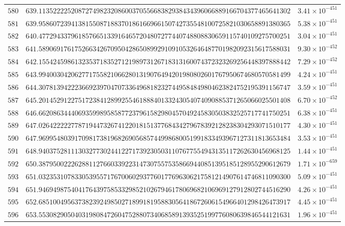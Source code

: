 \documentclass[12pt,reqno]{amsart}
\theoremstyle{remark}
\begin{document}
\begin{longtable}{clc}
$580$ & $639.1135222252087274982320860037055668382938434396066889166704377465641302$ & $3.41\times 10^{-451}$ \\
$581$ & $639.9586072394138155087188370186166966150742735548100725821030658891380365$ & $5.38\times 10^{-451}$ \\
$582$ & $640.4772943379618576651339164657204807277440748808830659115740109275700251$ & $3.04\times 10^{-451}$ \\
$583$ & $641.5890691761752663426709504286508992910910532646487701982092315617588031$ & $9.30\times 10^{-452}$ \\
$584$ & $642.1554245986132353718352712198973126718313160074372323269256448397888442$ & $7.29\times 10^{-452}$ \\
$585$ & $643.9940030420627717558210662801319076494201980802601767950674680570581499$ & $4.24\times 10^{-451}$ \\
$586$ & $644.3078139422236692397047073364968182327449584849804623824752195391156747$ & $3.59\times 10^{-451}$ \\
$587$ & $645.2014529122751723841289925546188840133243054074090885371265066025501408$ & $6.70\times 10^{-452}$ \\
$588$ & $646.6620863444069359989585877237961582980457049245830503832525717741750251$ & $6.38\times 10^{-451}$ \\
$589$ & $647.0264222227787194473267412201815137768434279678392128238304293071510177$ & $4.30\times 10^{-451}$ \\
$590$ & $647.9699548039170981738196826905685744998680051991833493967127311813653484$ & $3.53\times 10^{-451}$ \\
$591$ & $648.9403752811130327730244122717392305031107677554943135117262630456968125$ & $1.44\times 10^{-451}$ \\
$592$ & $650.3879500222628811276603392231473075575358669440851395185128955290612679$ & $1.71\times 10^{-659}$ \\
$593$ & $651.0323531078330539557176700602937760177696306217581214907614746811090300$ & $5.09\times 10^{-451}$ \\
$594$ & $651.9469498754041764397585332985210267946178069682106969127912802744516290$ & $4.26\times 10^{-451}$ \\
$595$ & $652.6851004956373823924985027189918195883056418672606154966401298426473917$ & $4.45\times 10^{-451}$ \\
$596$ & $653.5530829050403198084726047528807340685891393525199776080639846544121631$ & $1.96\times 10^{-451}$ \\

\end{longtable}
\end{document}
